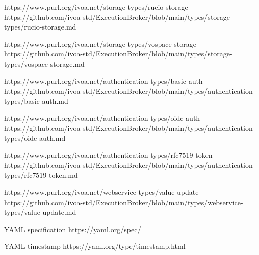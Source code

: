 \documentclass[11pt,a4paper]{ivoa}
\begin{document}
https://www.purl.org/ivoa.net/storage-types/rucio-storage
https://github.com/ivoa-std/ExecutionBroker/blob/main/types/storage-types/rucio-storage.md

https://www.purl.org/ivoa.net/storage-types/vospace-storage
https://github.com/ivoa-std/ExecutionBroker/blob/main/types/storage-types/vospace-storage.md

https://www.purl.org/ivoa.net/authentication-types/basic-auth
https://github.com/ivoa-std/ExecutionBroker/blob/main/types/authentication-types/basic-auth.md

https://www.purl.org/ivoa.net/authentication-types/oidc-auth
https://github.com/ivoa-std/ExecutionBroker/blob/main/types/authentication-types/oidc-auth.md

https://www.purl.org/ivoa.net/authentication-types/rfc7519-token
https://github.com/ivoa-std/ExecutionBroker/blob/main/types/authentication-types/rfc7519-token.md

https://www.purl.org/ivoa.net/webservice-types/value-update
https://github.com/ivoa-std/ExecutionBroker/blob/main/types/webservice-types/value-update.md

YAML specification
https://yaml.org/spec/

YAML timestamp
https://yaml.org/type/timestamp.html


\end{document}
